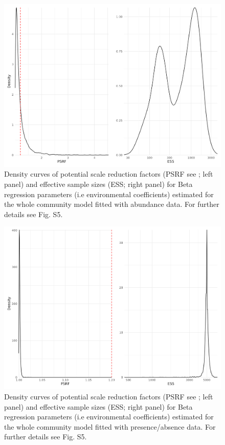 \begin{figure}
\hypertarget{fig:chapt1whole_comm_ab_beta}{%
\centering
\includegraphics{03-Chapitre1/figures/supplementary/fig_supp_conv_beta_WholecommunityAB.png}
\caption{Density curves of potential scale reduction factors (PSRF see
\textcite{Brooks_1998}; left panel) and effective sample sizes (ESS;
right panel) for Beta regression parameters (i.e environmental
coefficients) estimated for the whole community model fitted with
abundance data. For further details see Fig.
S5.}\label{fig:chapt1whole_comm_ab_beta}
}
\end{figure}

\begin{figure}
\hypertarget{fig:chapt1whole_comm_pa_beta}{%
\centering
\includegraphics{03-Chapitre1/figures/supplementary/fig_supp_conv_beta_WholecommunityPA.png}
\caption{Density curves of potential scale reduction factors (PSRF see
\textcite{Brooks_1998}; left panel) and effective sample sizes (ESS;
right panel) for Beta regression parameters (i.e environmental
coefficients) estimated for the whole community model fitted with
presence/absence data. For further details see Fig.
S5.}\label{fig:chapt1whole_comm_pa_beta}
}
\end{figure}

